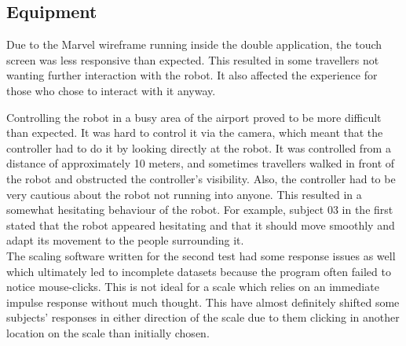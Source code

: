 \subsection{Equipment}
Due to the Marvel wireframe running inside the double application, the touch screen was less responsive than expected. This resulted in some travellers not wanting further interaction with the robot. It also affected the experience for those who chose to interact with it anyway.

Controlling the robot in a busy area of the airport proved to be more difficult than expected. It was hard to control it via the camera, which meant that the controller had to do it by looking directly at the robot. It was controlled from a distance of approximately 10 meters, and sometimes travellers walked in front of the robot and obstructed the controller's visibility. Also, the controller had to be very cautious about the robot not running into anyone. This resulted in a somewhat hesitating behaviour of the robot. For example, subject 03 in the first stated that the robot appeared hesitating and that it should move smoothly and adapt its movement to the people surrounding it.\\
The scaling software written for the second test had some response issues as well which ultimately led to incomplete datasets because the program often failed to notice mouse-clicks. This is not ideal for a scale which relies on an immediate impulse response without much thought. This have almost definitely shifted some subjects' responses in either direction of the scale due to them clicking in another location on the scale than initially chosen.